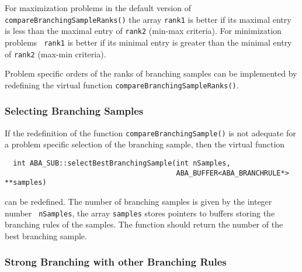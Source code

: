 For maximization problems
in the default version of {\tt compareBranchingSampleRanks()} the array
{\tt rank1} is better if its maximal entry is less than the maximal
entry of {\tt rank2} (min-max criteria). For minimization problems {\tt
  rank1} is better if its minimal entry is greater than the minimal
entry of {\tt rank2} (max-min criteria).

Problem specific orders of the ranks of branching samples can be
implemented by redefining the virtual function
{\tt compareBranchingSampleRanks()}.

\subsubsection{Selecting Branching Samples}

If the redefinition of the function {\tt compareBranchingSample()} is
not adequate for a problem specific selection of the branching sample,
then the virtual function
\begin{verbatim}
  int ABA_SUB::selectBestBranchingSample(int nSamples,
                                         ABA_BUFFER<ABA_BRANCHRULE*> **samples)
\end{verbatim}
can be redefined. The number of branching samples is given by the
integer number {\tt
  nSamples}, the array {\tt samples} stores pointers to buffers storing
the branching rules of the samples. The function should return the
number of the best branching sample.

\subsubsection{Strong Branching with other Branching Rules}

